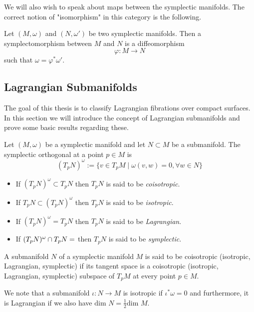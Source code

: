 We will also wish to speak about maps between the symplectic manifolds. The
correct notion of "isomorphism" in this category is the following.

\begin{definition}
    Let $(M, \omega)$ and $(N, \omega')$ be two symplectic manifolds. Then a symplectomorphism between $M$ and $N$ is a diffeomorphism
    $$\varphi: M \to N$$
    such that $\omega = \varphi^* \omega'$.
\end{definition}

\subsection{Lagrangian Submanifolds}
The goal of this thesis is to classify Lagrangian fibrations over compact
surfaces. In this section we will introduce the concept of Lagrangian
submanifolds and prove some basic results regarding these.
\begin{definition}
    Let $(M, \omega)$ be a symplectic manifold and let $N \subset M$ be a submanifold. The symplectic orthogonal at a point $p \in M$ is
    $$(T_pN)^{\omega} := \{v \in T_pM \mid \omega(v, w) = 0, \forall w \in N\}$$
\end{definition}

\begin{itemize}
    \item If $(T_pN)^{\omega} \subset T_pN$ then $T_pN$ is said to be \emph{coisotropic}.
    \item If $T_pN\subset (T_pN)^{\omega} $ then $T_pN$ is said to be \emph{isotropic}.
    \item If $(T_pN)^{\omega} = T_pN$ then $T_pN$ is said to be \emph{Lagrangian}.
    \item If $(T_pN)^{\omega} \cap T_pN = \empty$ then $T_pN$ is said to be
          \emph{symplectic}.
\end{itemize}

A submanifold $N$ of a symplectic manifold $M$ is said to be coisotropic
(isotropic, Lagrangian, symplectic) if its tangent space is a coisotropic
(isotropic, Lagrangian, symplectic) subspace of $T_pM$ at every point $p \in
    M$.

\begin{remark}
    We note that a submanifold $\iota : N \to M$ is isotropic if $\iota^*\omega =0$ and furthermore, it is Lagrangian if we also have
    $\text{dim }N = \frac{1}{2}\text{dim }M$.
\end{remark}

